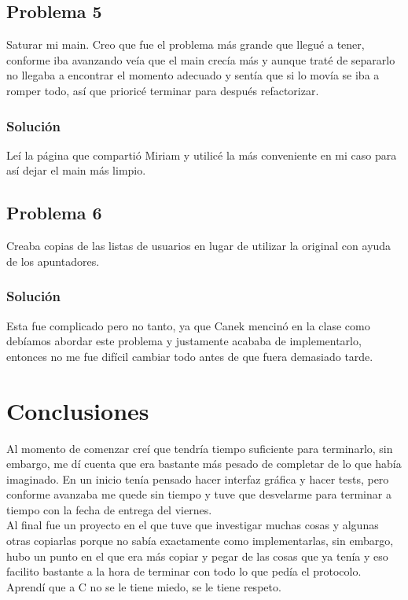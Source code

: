 \documentclass[12pt,a4paper]{article}
\begin{document}
\subsection{Problema 5}
Saturar mi main. 
Creo que fue el problema más grande que llegué a tener, conforme iba
avanzando veía que el main crecía más y aunque traté de separarlo no
llegaba a encontrar el momento adecuado y sentía que si lo movía se iba
a romper todo, así que prioricé terminar para después refactorizar.
\subsubsection{Solución}
Leí la página que compartió Miriam y utilicé la más conveniente en mi
caso para así dejar el main más limpio.

\subsection{Problema 6}
Creaba copias de las listas de usuarios en lugar de utilizar la original
con ayuda de los apuntadores.

\subsubsection{Solución}
Esta fue complicado pero no tanto, ya que Canek mencinó en la clase
como debíamos abordar este problema y justamente acababa de implementarlo,
entonces no me fue difícil cambiar todo antes de que fuera demasiado tarde.

\section{Conclusiones}
Al momento de comenzar creí que tendría tiempo suficiente para terminarlo, 
sin embargo, me dí cuenta que era bastante más pesado de completar de lo
que había imaginado. En un inicio tenía pensado hacer interfaz gráfica y
hacer tests, pero conforme avanzaba me quede sin tiempo y tuve que
desvelarme para terminar a tiempo con la fecha de entrega del viernes.\\
Al final fue un proyecto en el que tuve que investigar muchas cosas y
algunas otras copiarlas porque no sabía exactamente como implementarlas,
sin embargo, hubo un punto en el que era más copiar y pegar de las cosas
que ya tenía y eso facilito bastante a la hora de terminar con todo lo que 
pedía el protocolo.\\ 
Aprendí que a C no se le tiene miedo, se le tiene respeto.
\end{document}
